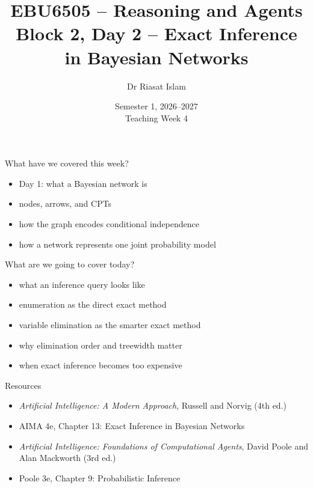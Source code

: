 \documentclass[aspectratio=169]{beamer}
\title[EBU6505 B2 D2]{EBU6505 -- Reasoning and Agents\\Block 2, Day 2 -- Exact Inference in Bayesian Networks}
\author{Dr Riasat Islam}
\institute{Queen Mary University of London}
\date[Teaching Week 4]{Semester 1, 2026--2027 \\ Teaching Week 4}
\newcommand{\defaultdeckrefs}{AIMA4e Ch.13 pp.412--460; Poole3e Ch.9 pp.375--458}
\newcommand{\currentsliderefs}{\defaultdeckrefs}
\newcommand{\setslideref}[1]{\gdef\currentsliderefs{#1}}
\begin{document}
\setslideref{AIMA4e Ch.13 pp.412--460; Poole3e Ch.9 pp.375--458}
\begin{frame}
  \titlepage
\end{frame}

\begin{frame}{What have we covered this week?}
\begin{itemize}
  \item Day 1: what a Bayesian network is
  \item nodes, arrows, and CPTs
  \item how the graph encodes conditional independence
  \item how a network represents one joint probability model
\end{itemize}
\end{frame}

\begin{frame}{What are we going to cover today?}
\begin{itemize}
  \item what an inference query looks like
  \item enumeration as the direct exact method
  \item variable elimination as the smarter exact method
  \item why elimination order and treewidth matter
  \item when exact inference becomes too expensive
\end{itemize}
\end{frame}

\begin{frame}{Resources}
\small
\begin{itemize}
  \item \textit{Artificial Intelligence: A Modern Approach}, Russell and Norvig (4th ed.)
  \item AIMA 4e, Chapter 13: Exact Inference in Bayesian Networks
  \item \textit{Artificial Intelligence: Foundations of Computational Agents}, David Poole and Alan Mackworth (3rd ed.)
  \item Poole 3e, Chapter 9: Probabilistic Inference
\end{itemize}
\end{frame}
\end{document}
